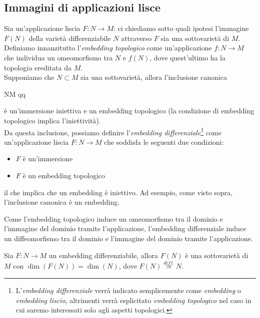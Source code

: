 \subsection{Immagini di applicazioni lisce}

Sia un'applicazione liscia $ F : N \to M $: ci chiediamo sotto quali ipotesi l'immagine $ F(N) $ della varietà differenziabile $ N $ attraverso $ F $ sia una sottovarietà di $ M $.\\
Definiamo innanzitutto l'\textit{embedding topologico} come un'applicazione $ f : N \to M $ che individua un omeomorfismo tra $ N $ e $ f(N) $, dove quest'ultimo ha la topologia ereditata da $ M $.\\
Supponiamo che $ N \subset M $ sia una sottovarietà, allora l'inclusione canonica

	{N}{M}
	{q}{q}

è un'immersione iniettiva e un embedding topologico (la condizione di embedding topologico implica l'iniettività).\\
Da questa inclusione, possiamo definire l'\textit{embedding differenziale}\footnote{%
	L'\textit{embedding differenziale} verrà indicato semplicemente come \textit{embedding} o \textit{embedding liscio}, altrimenti verrà esplicitato \textit{embedding topologico} nel caso in cui saremo interessati solo agli aspetti topologici.%
} come un'applicazione liscia $ F : N \to M $ che soddisfa le seguenti due condizioni:

\begin{itemize}
	\item $ F $ è un'immersione
	
	\item $ F $ è un embedding topologico
\end{itemize}

il che implica che un embedding è iniettivo. Ad esempio, come visto sopra, l'inclusione canonica è un embedding.

\begin{remark}
	Come l'embedding topologico induce un omeomorfismo tra il dominio e l'immagine del dominio tramite l'applicazione, l'embedding differenziale induce un diffeomorfismo tra il dominio e l'immagine del dominio tramite l'applicazione.
\end{remark}

\begin{theorem}\label{emb-subv}
	Sia $ F : N \to M $ un embedding differenziabile, allora $ F(N) $ è una sottovarietà di $ M $ con $ \dim(F(N)) = \dim(N) $, dove $ F(N) \stackrel{diff.}{\simeq} N $.
\end{theorem}


